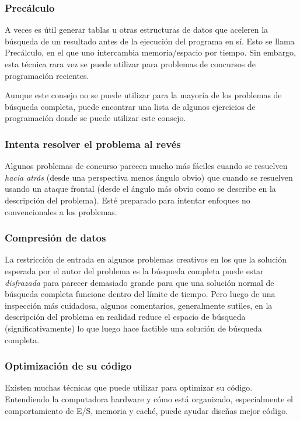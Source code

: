\subsubsection{Precálculo}

A veces es útil generar tablas u otras estructuras de datos que aceleren la búsqueda de un resultado antes de la ejecución del programa en sí. Esto se llama Precálculo, en el que uno intercambia memoria/espacio por tiempo. Sin embargo, esta técnica rara vez se puede utilizar para problemas de concursos de programación recientes.

Aunque este consejo no se puede utilizar para la mayoría de los problemas de búsqueda completa, puede encontrar una lista de algunos ejercicios de programación donde se puede utilizar este consejo.

\subsubsection{Intenta resolver el problema al revés}

Algunos problemas de concurso parecen mucho más fáciles cuando se resuelven \emph{hacia atrás} (desde una perspectiva menos ángulo obvio) que cuando se resuelven usando un ataque frontal (desde el ángulo más obvio como se describe en la descripción del problema). Esté preparado para intentar enfoques no convencionales a los problemas.

\subsubsection{Compresión de datos}

La restricción de entrada en algunos problemas creativos en los que la solución esperada por el autor del problema es la búsqueda completa puede estar \emph{disfrazada} para parecer demasiado grande para que una solución normal de búsqueda completa funcione dentro del límite de tiempo. Pero luego de una inspección más cuidadosa, algunos comentarios, generalmente sutiles, en la descripción del problema en realidad reduce el espacio de búsqueda (significativamente) lo que luego hace factible una solución de búsqueda completa.

\subsubsection{Optimización de su código}

Existen muchas técnicas que puede utilizar para optimizar su código. Entendiendo la computadora
hardware y cómo está organizado, especialmente el comportamiento de E/S, memoria y caché, puede ayudar
diseñas mejor código.

